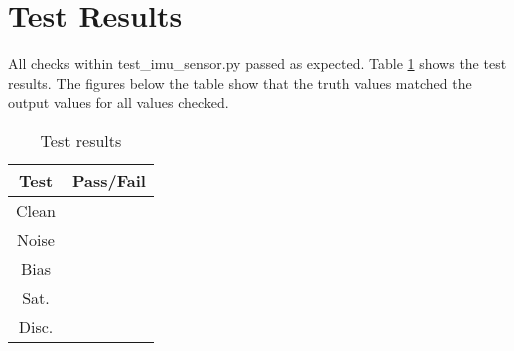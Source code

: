 \section{Test Results}
All checks within test\_imu\_sensor.py passed as expected. Table \ref{tab:results} shows the test results. The figures below the table show that the truth values matched the output values for all values checked.

\begin{table}[H]
	\caption{Test results}
	\label{tab:results}
	\centering \fontsize{10}{10}\selectfont
	\begin{tabular}{c | c  } %
		\hline
		\textbf{Test} 						  		&\textbf{Pass/Fail} \\ \hline
		Clean	   			&  \\ \hline
		Noise	   			&  \\ \hline
		Bias	   			&  \\ \hline
		Sat.	   			&  \\ \hline
		Disc.	   			&  \\ \hline
	\end{tabular}
\end{table}






























	

\pagebreak %